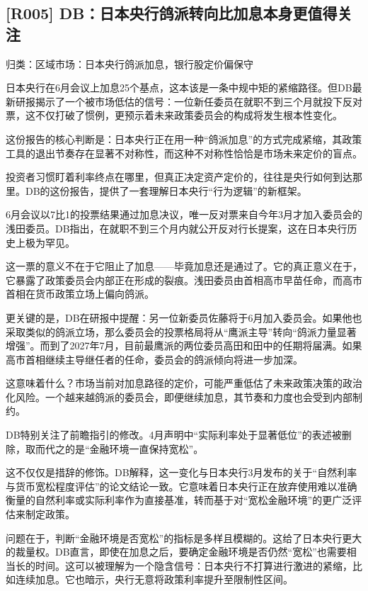 \documentclass[11pt]{ctexart}
\begin{document}
\subsection{[R005] DB：日本央行鸽派转向比加息本身更值得关注}
{\small\color{refgray}归类：区域市场：日本央行鸽派加息，银行股定价偏保守}

日本央行在6月会议上加息25个基点，这本该是一条中规中矩的紧缩路径。但DB最新研报揭示了一个被市场低估的信号：一位新任委员在就职不到三个月就投下反对票，这不仅打破了惯例，更预示着未来政策委员会的构成将发生根本性变化。

这份报告的核心判断是：日本央行正在用一种“鸽派加息”的方式完成紧缩，其政策工具的退出节奏存在显著不对称性，而这种不对称性恰恰是市场未来定价的盲点。

投资者习惯盯着利率终点在哪里，但真正决定资产定价的，往往是央行如何到达那里。DB的这份报告，提供了一套理解日本央行“行为逻辑”的新框架。

6月会议以7比1的投票结果通过加息决议，唯一反对票来自今年3月才加入委员会的浅田委员。DB指出，在就职不到三个月内就公开反对行长提案，这在日本央行历史上极为罕见。

这一票的意义不在于它阻止了加息——毕竟加息还是通过了。它的真正意义在于，它暴露了政策委员会内部正在形成的裂痕。浅田委员由首相高市早苗任命，而高市首相在货币政策立场上偏向鸽派。

更关键的是，DB在研报中提醒：另一位新委员佐藤将于6月加入委员会。如果他也采取类似的鸽派立场，那么委员会的投票格局将从“鹰派主导”转向“鸽派力量显著增强”。而到了2027年7月，目前最鹰派的两位委员高田和田中的任期将届满。如果高市首相继续主导继任者的任命，委员会的鸽派倾向将进一步加深。

这意味着什么？市场当前对加息路径的定价，可能严重低估了未来政策决策的政治化风险。一个越来越鸽派的委员会，即便继续加息，其节奏和力度也会受到内部制约。

DB特别关注了前瞻指引的修改。4月声明中“实际利率处于显著低位”的表述被删除，取而代之的是“金融环境一直保持宽松”。

这不仅仅是措辞的修饰。DB解释，这一变化与日本央行3月发布的关于“自然利率与货币宽松程度评估”的论文结论一致。它意味着日本央行正在放弃使用难以准确衡量的自然利率或实际利率作为直接基准，转而基于对“宽松金融环境”的更广泛评估来制定政策。

问题在于，判断“金融环境是否宽松”的指标是多样且模糊的。这给了日本央行更大的裁量权。DB直言，即使在加息之后，要确定金融环境是否仍然“宽松”也需要相当长的时间。这可以被理解为一个隐含信号：日本央行不打算进行激进的紧缩，比如连续加息。它也暗示，央行无意将政策利率提升至限制性区间。
\end{document}
